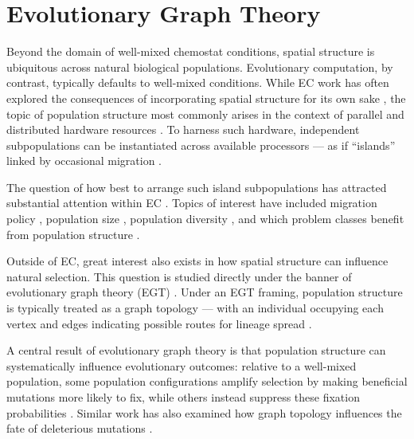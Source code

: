 \section{Evolutionary Graph Theory}
\label{sec:egt}

Beyond the domain of well-mixed chemostat conditions, spatial structure is ubiquitous across natural biological populations.
Evolutionary computation, by contrast, typically defaults to well-mixed conditions.
While EC work has often explored the consequences of incorporating spatial structure for its own sake
\citep{tomassini2005spatially,simon2008biogeographybased}, the topic of population structure most commonly arises in the context of parallel and distributed hardware resources \citep{cantupaz1999scalability}.
To harness such hardware, independent subpopulations can be instantiated across available processors --- as if ``islands'' linked by occasional migration \citep{cohoon1987punctuated,grosso1985computer,tanese1989distributed}.

The question of how best to arrange such island subpopulations has attracted substantial attention within EC \citep{whitley1999island,cantupaz1999topologies,rucinski2010impact}.
Topics of interest have included migration policy \citep{cantupaz2001migration,cantupaz1999topologies}, population size \citep{whitley1999island,goldberg1989sizing,cantupaz2001efficient}, population diversity \citep{tanese1989distributed,whitley1999island}, and which problem classes benefit from population structure \citep{lassig2013design}.

Outside of EC, great interest also exists in how spatial structure can influence natural selection.
This question is studied directly under the banner of evolutionary graph theory (EGT) \citep{lieberman2005evolutionary}.
Under an EGT framing, population structure is typically treated as a graph topology --- with an individual occupying each vertex and edges indicating possible routes for lineage spread \citep{pattni2015evolutionary}.

A central result of evolutionary graph theory is that population structure can systematically influence evolutionary outcomes: relative to a well-mixed population, some population configurations amplify selection by making beneficial mutations more likely to fix, while others instead suppress these fixation probabilities \citep{lieberman2005evolutionary,pavlogiannis2018construction,allen2017evolutionary}.
Similar work has also examined how graph topology influences the fate of deleterious mutations \citep{sharma2022suppressors}.

